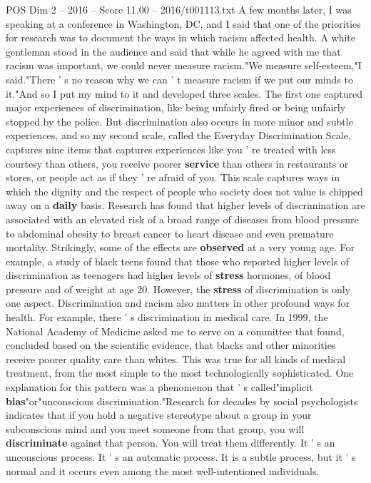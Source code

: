 \begin{textsample}{POS Dim 2 – 2016 – Score 11.00 – 2016/t001113.txt}
A few months later, I was speaking at a conference in Washington, DC, and I said that one of the priorities for research was to document the ways in which racism affected health.
A white gentleman stood in the audience and said that while he agreed with me that racism was important, we could never measure racism."We measure self-esteem,"I said."There ' s no reason why we can ' t measure racism if we put our minds to it."And so I put my mind to it and developed three scales.
The first one captured major experiences of discrimination, like being unfairly fired or being unfairly stopped by the police.
But discrimination also occurs in more minor and subtle experiences, and so my second scale, called the Everyday Discrimination Scale, captures nine items that captures experiences like you ' re treated with less courtesy than others, you receive poorer \textbf{service} than others in restaurants or stores, or people act as if they ' re afraid of you.
This scale captures ways in which the dignity and the respect of people who society does not value is chipped away on a \textbf{daily} basis.
Research has found that higher levels of discrimination are associated with an elevated risk of a broad range of diseases from blood pressure to abdominal obesity to breast cancer to heart disease and even premature mortality.
Strikingly, some of the effects are \textbf{observed} at a very young age.
For example, a study of black teens found that those who reported higher levels of discrimination as teenagers had higher levels of \textbf{stress} hormones, of blood pressure and of weight at age 20.
However, the \textbf{stress} of discrimination is only one aspect.
Discrimination and racism also matters in other profound ways for health.
For example, there ' s discrimination in medical care.
In 1999, the National Academy of Medicine asked me to serve on a committee that found, concluded based on the scientific evidence, that blacks and other minorities receive poorer quality care than whites.
This was true for all kinds of medical treatment, from the most simple to the most technologically sophisticated.
One explanation for this pattern was a phenomenon that ' s called"implicit \textbf{bias}"or"unconscious discrimination."Research for decades by social psychologists indicates that if you hold a negative stereotype about a group in your subconscious mind and you meet someone from that group, you will \textbf{discriminate} against that person.
You will treat them differently.
It ' s an unconscious process.
It ' s an automatic process.
It is a subtle process, but it ' s normal and it occurs even among the most well-intentioned individuals.

\end{textsample}
